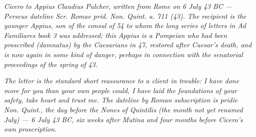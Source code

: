 
\textit{Cicero to Appius Claudius Pulcher, written from Rome
on 6 July 43 BC --- Perseus dateline \textit{Scr. Romae prid.
Non. Quint. a. 711 (43)}. The recipient is the younger Appius,
son of the consul of 54 to whom the long series of letters in
\textit{Ad Familiares} book 3 was addressed; this Appius is a
Pompeian who had been proscribed (\textit{damnatus}) by the
Caesarians in 47, restored after Caesar's death, and is now
again in some kind of danger, perhaps in connection with
the senatorial proceedings of the spring of 43.}

\textit{The letter is the standard short reassurance to a
client in trouble: I have done more for you than your own
people could, I have laid the foundations of your safety,
take heart and trust me. The dateline by Roman subscription
is \textit{pridie Non. Quint.}, the day before the Nones of
Quintilis (the month not yet renamed July) --- 6 July 43 BC,
six weeks after Mutina and four months before Cicero's own
proscription.}
